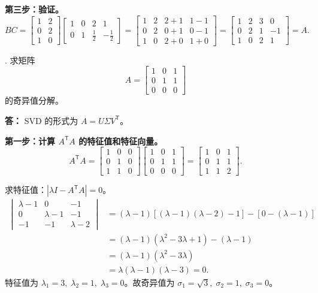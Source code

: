\documentclass{article}
\begin{document}
\textbf{第三步：验证。}
\[
BC = \begin{bmatrix}
1 & 2\\
0 & 2\\
1 & 0
\end{bmatrix}
\begin{bmatrix}
1 & 0 & 2 & 1\\
0 & 1 & \frac12 & -\frac12
\end{bmatrix}
= \begin{bmatrix}
1 & 2 & 2+1 & 1-1\\
0 & 2 & 0+1 & 0-1\\
1 & 0 & 2+0 & 1+0
\end{bmatrix}
= \begin{bmatrix}
1 & 2 & 3 & 0\\
0 & 2 & 1 & -1\\
1 & 0 & 2 & 1
\end{bmatrix}
= A.
\]
\newpage

. 求矩阵
\[
A=\begin{bmatrix}
1 & 0 & 1 \\
0 & 1 & 1 \\
0 & 0 & 0
\end{bmatrix}
\]
的奇异值分解。

\noindent \textbf{答：}
SVD 的形式为 $A = U\Sigma V^{\mathsf T}$。

\textbf{第一步：计算 $A^{\mathsf T}A$ 的特征值和特征向量。}
\[
A^{\mathsf T}A = \begin{bmatrix}
1 & 0 & 0\\
0 & 1 & 0\\
1 & 1 & 0
\end{bmatrix}
\begin{bmatrix}
1 & 0 & 1\\
0 & 1 & 1\\
0 & 0 & 0
\end{bmatrix}
= \begin{bmatrix}
1 & 0 & 1\\
0 & 1 & 1\\
1 & 1 & 2
\end{bmatrix}.
\]

求特征值：$|\lambda I - A^{\mathsf T}A| = 0$。
\begin{align*}
\begin{vmatrix}
\lambda-1 & 0 & -1\\
0 & \lambda-1 & -1\\
-1 & -1 & \lambda-2
\end{vmatrix}
&= (\lambda-1)[(\lambda-1)(\lambda-2)-1] - [0-(\lambda-1)]\\
&= (\lambda-1)(\lambda^2-3\lambda+1) - (\lambda-1)\\
&= (\lambda-1)(\lambda^2-3\lambda)\\
&= \lambda(\lambda-1)(\lambda-3) = 0.
\end{align*}
特征值为 $\lambda_1=3,\;\lambda_2=1,\;\lambda_3=0$。故奇异值为 $\sigma_1=\sqrt{3},\;\sigma_2=1,\;\sigma_3=0$。
\end{document}
